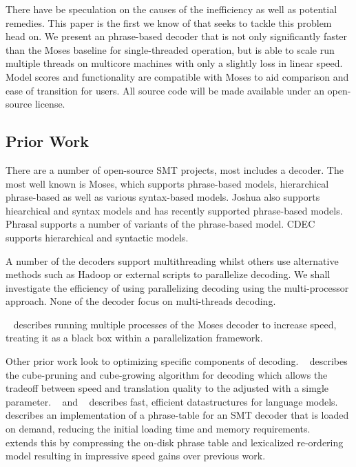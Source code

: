 \documentclass[11pt]{article}
\begin{document}
There have be speculation on the causes of the inefficiency as well as potential remedies. This paper is the first we know of that seeks to tackle this problem head on. We present an phrase-based decoder that is not only significantly faster than the Moses baseline for single-threaded operation, but is able to scale run multiple threads on multicore machines with only a slightly loss in linear speed. Model scores and functionality are compatible with Moses to aid comparison and ease of transition for users. All source code will be made available under an open-source license.

\subsection{Prior Work}

There are a number of open-source SMT projects, most includes a decoder. The most well known is Moses, which supports phrase-based models, hierarchical phrase-based as well as various syntax-based models. Joshua also supports hiearchical and syntax models and has recently supported phrase-based models. Phrasal supports a number of variants of the phrase-based model. CDEC supports hierarchical and syntactic models.

A number of the decoders support multithreading whilst others use alternative methods such as Hadoop or external scripts to parallelize decoding. We shall investigate the efficiency of using parallelizing decoding using the multi-processor approach. None of the decoder focus on multi-threads decoding. 

~ describes running multiple processes of the Moses decoder to increase speed, treating it as a black box within a parallelization framework.

Other prior work look to optimizing specific components of decoding. ~ describes the cube-pruning and cube-growing algorithm for decoding which allows the tradeoff between speed and translation quality to the adjusted with a simgle parameter. ~ and ~ describes fast, efficient datastructures for language models. ~ describes an implementation of a phrase-table for an SMT decoder that is loaded on demand, reducing the initial loading time and memory requirements. ~ extends this by compressing the on-disk phrase table and lexicalized re-ordering model resulting in impressive speed gains over previous work.
\end{document}
